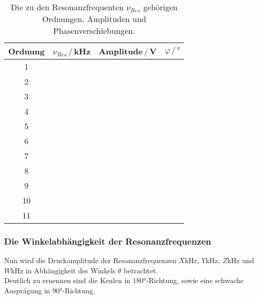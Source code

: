 \begin{table}[H]
    \center
    \caption{Die zu den Resonanzfrequenten $\nu_{Res}$ gehörigen Ordnungen, Amplituden und Phasenverschiebungen.}
    \begin{tabular}{c c c c}
        \toprule
        Ordnung & $\nu_{Res}\,/\,$kHz & Amplitude$\,/\,$V & $\varphi\,/\,°$\\
        \midrule
        1 & & & \\
        2 & & & \\
        3 & & & \\
        4 & & & \\
        5 & & & \\
        6 & & & \\
        7 & & & \\
        8 & & & \\
        9 & & & \\
        10 & & & \\
        11 & & & \\
        \bottomrule
    \end{tabular}
\end{table}

\subsubsection{Die Winkelabhängigkeit der Resonanzfrequenzen}
Nun wird die Druckamplitude der Resonanzfrequenzen $X$kHz, $Y$kHz, $Z$kHz und $W$kHz 
in Abhängigkeit des Winkels $\theta$ betrachtet.\\
Deutlich zu ernennen sind die Keulen in $180°$-Richtung, sowie eine schwache Ausprägung in $90°$-Richtung.

\begin{figure}[H]
    \centering
    \hfil
    \hfil 
    
    \hfil
    \hfil 
    \caption{}\label{figure}
\end{figure}
